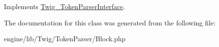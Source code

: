 Implements \hyperlink{interface_twig___token_parser_interface_a5dfa2e269321584fb74e8b43dabe0efd}{Twig\+\_\+\+Token\+Parser\+Interface}.



The documentation for this class was generated from the following file\+:\begin{DoxyCompactItemize}
\item 
engine/lib/\+Twig/\+Token\+Parser/Block.\+php\end{DoxyCompactItemize}

